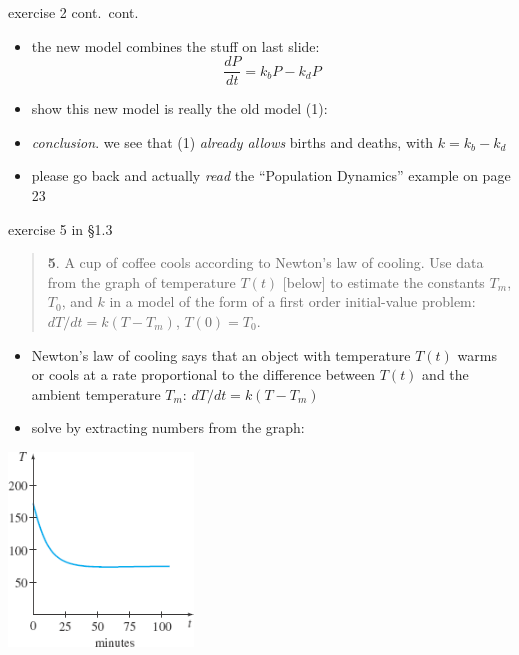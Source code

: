 \documentclass{beamer}
\begin{document}
\begin{frame}{exercise 2 cont.~cont.}

\begin{itemize}
\item the new model combines the stuff on last slide:
    $$\frac{dP}{dt} = k_b P - k_d P$$
\item show this new model is really the old model (1):
\vspace{20mm}

\bigskip
\item \emph{conclusion}.  we see that (1) \emph{already allows} births and deaths, with $k=k_b-k_d$

\bigskip
\item \alert{please go back and actually \emph{read} the ``Population Dynamics'' example on page 23}
\end{itemize}
\end{frame}


\begin{frame}{exercise 5 in \S 1.3}

\scriptsize
\begin{quotation}
\noindent \textbf{5}.  A cup of coffee cools according to Newton's law of cooling.  Use data from the graph of temperature $T(t)$ [below] to estimate the constants $T_m$, $T_0$, and $k$ in a model of the form of a first order initial-value problem: $dT/dt = k(T-T_m)$, $T(0)=T_0$.
\end{quotation}

\vspace{-4mm}

\small
\begin{itemize}
\item Newton's law of cooling says that an object with temperature $T(t)$ warms or cools at a rate proportional to the difference between $T(t)$ and the ambient temperature $T_m$: \quad $dT/dt = k(T-T_m)$
\item solve by extracting numbers from the graph:
\end{itemize}

\vspace{-1mm}

\includegraphics[width=0.37\textwidth]{exercise-5-1-3}
\end{frame}
\end{document}
